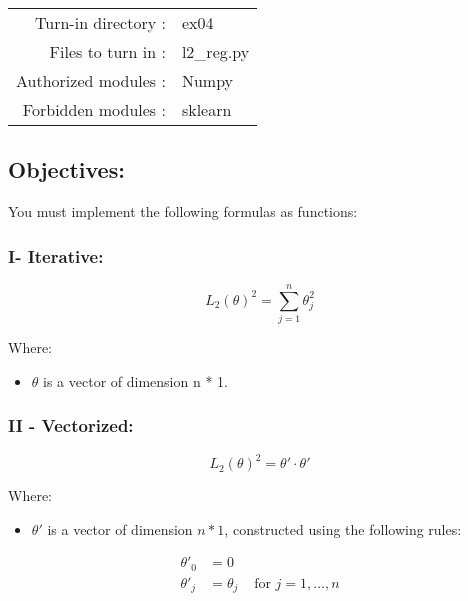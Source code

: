 \documentclass[]{article}
\providecommand{\tightlist}{%
  \setlength{\itemsep}{0pt}\setlength{\parskip}{0pt}}
\begin{document}
\begin{longtable}[]{@{}rl@{}}
\toprule
\endhead
Turn-in directory : & ex04\tabularnewline
Files to turn in : & l2\_reg.py\tabularnewline
Authorized modules : & Numpy\tabularnewline
Forbidden modules : & sklearn\tabularnewline
\bottomrule
\end{longtable}

\hypertarget{objectives-3}{%
\subsection{Objectives:}\label{objectives-3}}

You must implement the following formulas as functions:

\hypertarget{i--iterative}{%
\subsubsection{I- Iterative:}\label{i--iterative}}

\large

\[
L_2(\theta)^2 = \sum_{j = 1}^n \theta_j^2
\] \normalsize

Where:

\begin{itemize}
\tightlist
\item
  \(\theta\) is a vector of dimension n * 1.
\end{itemize}

\hypertarget{ii---vectorized}{%
\subsubsection{II - Vectorized:}\label{ii---vectorized}}

\large

\[
L_2(\theta)^2 = \theta' \cdot \theta'
\] \normalsize

Where:

\begin{itemize}
\tightlist
\item
  \(\theta'\) is a vector of dimension \(n * 1\), constructed using the
  following rules:
\end{itemize}

\large

\[
\begin{matrix}
\theta'_0 & =  0 \\
\theta'_j & =  \theta_j & \text{ for } j = 1, \dots, n\\    
\end{matrix}
\] \normalsize
\end{document}

